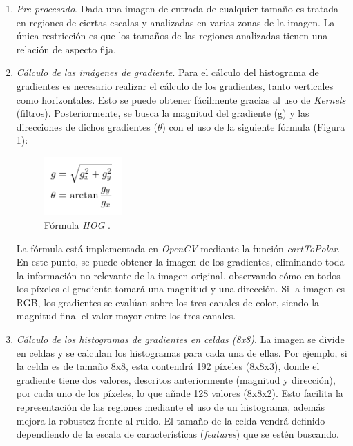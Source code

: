 \begin{enumerate}
	\item \textit{Pre-procesado}. Dada una imagen de entrada de cualquier tamaño es tratada en regiones de ciertas escalas y analizadas en varias zonas de la imagen. La única restricción es que los tamaños de las regiones analizadas tienen una relación de aspecto fija.
	
	\item \textit{Cálculo de las imágenes de gradiente}. Para el cálculo del histograma de gradientes es necesario realizar el cálculo de los gradientes, tanto verticales como horizontales. Esto se puede obtener fácilmente gracias al uso de \textit{Kernels} (filtros). Posteriormente, se busca la magnitud del gradiente (g) y las direcciones de dichos gradientes ($\theta$) con el uso de la siguiente fórmula (Figura \ref{fig:hogf}):
	
	\begin{figure}[htp]
		\centering
		\includegraphics[width=3cm]{imagenes/HOGFormula.png}
		\caption[Fórmula \textit{HOG}.]{Fórmula \textit{HOG} \cite{hog2}.}
		\label{fig:hogf}
	\end{figure}
	
	La fórmula está implementada en \textit{OpenCV} mediante la función \textit{cartToPolar}. En este punto, se puede obtener la imagen de los gradientes, eliminando toda la información no relevante de la imagen original, observando cómo en todos los píxeles el gradiente tomará una magnitud y una dirección. Si la imagen es RGB, los gradientes se evalúan sobre los tres canales de color, siendo la magnitud final el valor mayor entre los tres canales.
	
	\item \textit{Cálculo de los histogramas de gradientes en celdas (8x8)}. La imagen se divide en celdas y se calculan los histogramas para cada una de ellas. Por ejemplo, si la celda es de tamaño 8x8, esta contendrá 192 píxeles (8x8x3), donde el gradiente tiene dos valores, descritos anteriormente (magnitud y dirección), por cada uno de los píxeles, lo que añade 128 valores (8x8x2). Esto facilita la representación de las regiones mediante el uso de un histograma, además mejora la robustez frente al ruido. El tamaño de la celda vendrá definido dependiendo de la escala de características (\textit{features}) que se estén buscando.
	

\end{enumerate}

